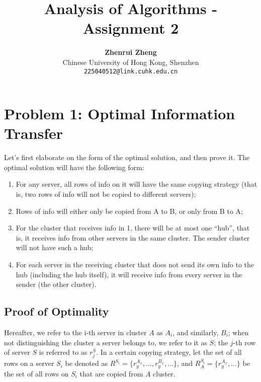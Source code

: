 \documentclass[11pt, a4paper, oneside]{memoir}
\title{\huge\textbf{Analysis of Algorithms - Assignment 2}\vspace{-0.5cm}}
\author{\textbf{Zhenrui Zheng} \vspace{0.5cm} \\ \small Chinese University of Hong Kong, Shenzhen \\ \small\texttt{225040512@link.cuhk.edu.cn}}
\date{}
\begin{document}
\begin{titlingpage}
  \maketitle
  \renewcommand{\contentsname}{\huge Contents \vspace{-1cm}}
  \begin{KeepFromToc} %
    \tableofcontents
  \end{KeepFromToc}
\end{titlingpage}

\chapter{Problem 1: Optimal Information Transfer}
Let's first elaborate on the form of the optimal solution, and then prove it.
The optimal solution will have the following form:
\begin{enumerate}
  \item For any server, all rows of info on it will have the same copying strategy
        (that is, two rows of info will not be copied to different servers);
  \item Rows of info will either only be copied from A to B, or only from B to A;
  \item For the cluster that receives info in 1, there will be at most one ``hub'',
        that is, it receives info from other servers in the same cluster. The sender cluster will not have such a hub;
  \item For each server in the receiving cluster that does not send its own info to the hub (including the hub itself),
        it will receive info from every server in the sender (the other cluster).
\end{enumerate}

\section{Proof of Optimality}
Hereafter, we refer to the i-th server in cluster $A$ as $A_i$, and similarly, $B_i$;
when not distinguishing the cluster a server belongs to, we refer to it as $S$;
the $j$-th row of server $S$ is referred to as $r^S_j$. In a certain copying strategy,
let the set of all rows on a server $S_i$ be denoted as $R^{S_i}=\{r^{A_x}_y, ..., r^{B_x}_y, ...\}$,
and $R^{S_i}_A=\{r^{A_x}_y,...\}$ be the set of all rows on $S_i$ that are copied from $A$ cluster.
\end{document}

